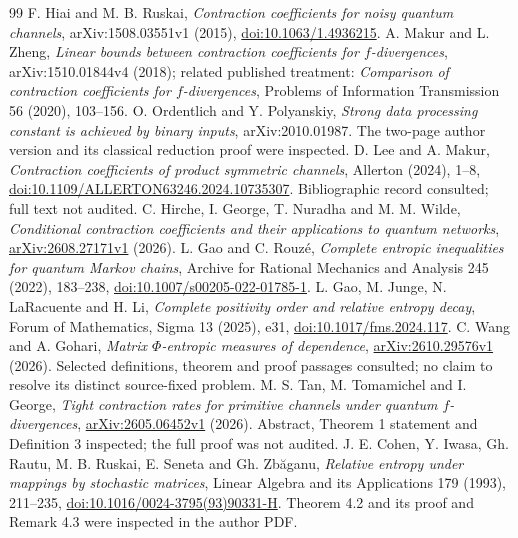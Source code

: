 \documentclass[11pt]{article}
\theoremstyle{remark}\newtheorem{remark}[theorem]{Remark}
\begin{document}
\begin{thebibliography}{99}
 F. Hiai and M. B. Ruskai, \emph{Contraction coefficients for noisy quantum channels}, arXiv:1508.03551v1 (2015), \href{https://doi.org/10.1063/1.4936215}{doi:10.1063/1.4936215}.
 A. Makur and L. Zheng, \emph{Linear bounds between contraction coefficients for $f$-divergences}, arXiv:1510.01844v4 (2018); related published treatment: \emph{Comparison of contraction coefficients for $f$-divergences}, Problems of Information Transmission 56 (2020), 103--156.
 O. Ordentlich and Y. Polyanskiy, \emph{Strong data processing constant is achieved by binary inputs}, arXiv:2010.01987. The two-page author version and its classical reduction proof were inspected.
 D. Lee and A. Makur, \emph{Contraction coefficients of product symmetric channels}, Allerton (2024), 1--8, \href{https://doi.org/10.1109/ALLERTON63246.2024.10735307}{doi:10.1109/ALLERTON63246.2024.10735307}. Bibliographic record consulted; full text not audited.
 C. Hirche, I. George, T. Nuradha and M. M. Wilde, \emph{Conditional contraction coefficients and their applications to quantum networks}, \href{https://arxiv.org/abs/2608.27171v1}{arXiv:2608.27171v1} (2026).
 L. Gao and C. Rouz\'e, \emph{Complete entropic inequalities for quantum Markov chains}, Archive for Rational Mechanics and Analysis 245 (2022), 183--238, \href{https://doi.org/10.1007/s00205-022-01785-1}{doi:10.1007/s00205-022-01785-1}.
 L. Gao, M. Junge, N. LaRacuente and H. Li, \emph{Complete positivity order and relative entropy decay}, Forum of Mathematics, Sigma 13 (2025), e31, \href{https://doi.org/10.1017/fms.2024.117}{doi:10.1017/fms.2024.117}.
 C. Wang and A. Gohari, \emph{Matrix $\Phi$-entropic measures of dependence}, \href{https://arxiv.org/abs/2610.29576v1}{arXiv:2610.29576v1} (2026). Selected definitions, theorem and proof passages consulted; no claim to resolve its distinct source-fixed problem.
 M. S. Tan, M. Tomamichel and I. George, \emph{Tight contraction rates for primitive channels under quantum $f$-divergences}, \href{https://arxiv.org/abs/2605.06452v1}{arXiv:2605.06452v1} (2026). Abstract, Theorem 1 statement and Definition 3 inspected; the full proof was not audited.
 J. E. Cohen, Y. Iwasa, Gh. Rautu, M. B. Ruskai, E. Seneta and Gh. Zb\u aganu, \emph{Relative entropy under mappings by stochastic matrices}, Linear Algebra and its Applications 179 (1993), 211--235, \href{https://doi.org/10.1016/0024-3795(93)90331-H}{doi:10.1016/0024-3795(93)90331-H}. Theorem 4.2 and its proof and Remark 4.3 were inspected in the author PDF.

\end{thebibliography}
\end{document}
